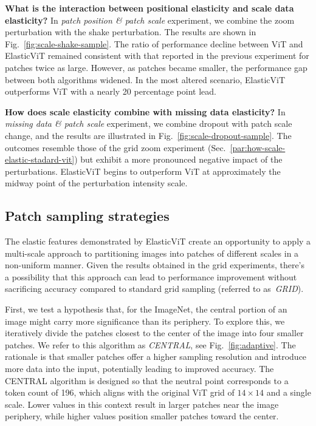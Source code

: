 \documentclass[10pt,twocolumn,letterpaper]{article}
\begin{document}


\textbf{What is the interaction between positional elasticity and scale data elasticity?}
In \textit{patch position \& patch scale} experiment, we combine the zoom perturbation with the shake perturbation. The results are shown in Fig.~\ref{fig:scale-shake-sample}. The ratio of performance decline between ViT and ElasticViT remained consistent with that reported in the previous experiment for patches twice as large. However, as patches became smaller, the performance gap between both algorithms widened. In the most altered scenario, ElasticViT outperforms ViT with a nearly 20 percentage point lead.

\textbf{How does scale elasticity combine with missing data elasticity?}
In \textit{missing data \& patch scale} experiment, we combine dropout with patch scale change, and the results are illustrated in Fig.~\ref{fig:scale-dropout-sample}. The outcomes resemble those of the grid zoom experiment (Sec.~\ref{par:how-scale-elastic-stadard-vit}) but exhibit a more pronounced negative impact of the perturbations. ElasticViT begins to outperform ViT at approximately the midway point of the perturbation intensity scale.

\subsection{Patch sampling strategies}
\label{sec:multiscale-adaptation}
The elastic features demonstrated by ElasticViT create an opportunity to apply a multi-scale approach to partitioning images into patches of different scales in a non-uniform manner. Given the results obtained in the grid experiments, there's a possibility that this approach can lead to performance improvement without sacrificing accuracy compared to standard grid sampling (referred to as~\textit{GRID}).



First, we test a hypothesis that, for the ImageNet, the central portion of an image might carry more significance than its periphery. To explore this, we iteratively divide the patches closest to the center of the image into four smaller patches. We refer to this algorithm as \textit{CENTRAL}, see Fig.~\ref{fig:adaptive}. The rationale is that smaller patches offer a higher sampling resolution and introduce more data into the input, potentially leading to improved accuracy. The CENTRAL algorithm is designed so that the neutral point corresponds to a token count of 196, which aligns with the original ViT grid of $14\times14$ and a single scale. Lower values in this context result in larger patches near the image periphery, while higher values position smaller patches toward the center.
\end{document}
